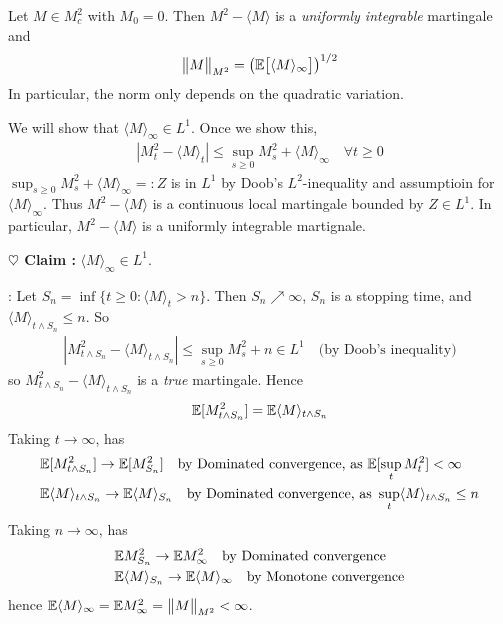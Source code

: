 \documentclass[12pt,a4paper]{article}
\newenvironment{proof}
{\begin{changemargin}{0.5cm}{0.5cm} 
	}%
	{\end{changemargin}
}
\newenvironment{subproof}
{\begin{changemargin}{0.5cm}{0.5cm} 
	}%
	{\end{changemargin}
}
\newenvironment{p}
{\begin{proof} 
	}%
	{\end{proof}
}
\begin{document}
\prop Let $M\in M^2_c$ with $M_0 =0$. Then $M^2 -\langle M \rangle$ is a \emph{uniformly integrable} martingale and
\begin{align*}
\bigl\lVert M\bigr\rVert_{M^2} = \big( \mathbb{E} \big[\langle M \rangle_{\infty} \big] \big)^{1/2}
\end{align*}
In particular, the norm only depends on the quadratic variation.
\begin{p}
\pf We will show that $\langle M \rangle_{\infty} \in L^1$. Once we show this,
\begin{align*}
|M_t^2 - \langle M \rangle_t| \leq \sup_{s\geq 0} M_s^2 + \langle M \rangle_{\infty} \quad \forall t \geq 0
\end{align*}
$\sup_{s\geq 0} M_s^2 + \langle M \rangle_{\infty} =: Z$ is in $L^1$ by Doob's $L^2$-inequality and assumptioin for $\langle M \rangle_{\infty}$. Thus $M^2 - \langle M \rangle $ is a continuous local martingale bounded by $Z \in L^1$. In particular, $M^2 - \langle M \rangle$ is a uniformly integrable martignale.
\s

\textbf{$\heartsuit$ Claim :} $\langle M \rangle_{\infty} \in L^1$.
\begin{subproof}
: Let $S_n = \inf \{ t\geq 0: \langle M \rangle_t >n \}$. Then $S_n \nearrow \infty$, $S_n$ is a stopping time, and $\langle M \rangle_{t\wedge S_n}\leq n$. So
\begin{align*}
|M^2_{t\wedge S_n} - \langle M \rangle_{t\wedge S_n}| \leq \sup_{s\geq 0} M_s^2 + n \in L^1 \quad \text{(by Doob's inequality)}
\end{align*}
so $M^2_{t\wedge S_n} - \langle M \rangle_{t\wedge S_n}$ is a \emph{true} martingale. Hence
\begin{align*}
\mathbb{E} [M^2_{t\wedge S_n}] = \mathbb{E} \langle M \rangle_{t\wedge S_n}
\end{align*}
Taking $t\rightarrow \infty$, has 
\begin{align*}
&\mathbb{E} [M^2_{t\wedge S_n}] \rightarrow \mathbb{E} [M^2_{S_n}] \quad \text{by Dominated convergence, as } \mathbb{E}[\sup_{t} M_t^2] < \infty \\
&\mathbb{E} \langle M\rangle_{t\wedge S_n} \rightarrow \mathbb{E} \langle M \rangle_{S_n} \quad \text{by Dominated convergence, as } \sup_t \langle M \rangle_{t\wedge S_n} \leq n 
\end{align*}
Taking $n\rightarrow \infty$, has
\begin{align*}
&\mathbb{E} M^2_{S_n} \rightarrow \mathbb{E} M^2_{\infty} \quad \text{by Dominated convergence} \\
&\mathbb{E} \langle M \rangle_{S_n} \rightarrow \mathbb{E} \langle M \rangle_{\infty} \quad \text{by Monotone convergence}
\end{align*}
hence $\mathbb{E} \langle M \rangle_{\infty} = \mathbb{E} M^2_{\infty} = \bigl\lVert M\bigr\rVert_{M^2} < \infty$.
\end{subproof}
\eop
\end{p}
\end{document}
